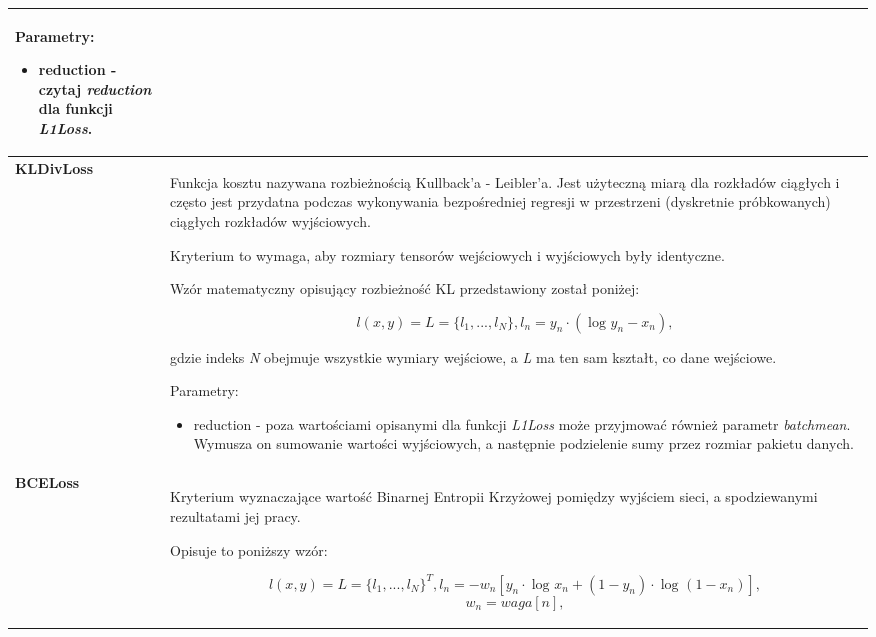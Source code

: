 \begin{enumerate}
\begin{small}
\begin{longtable}{ |m{2cm}|m{12cm}| }
       Parametry:
       \begin{itemize}
       \item reduction - czytaj \textit{reduction} dla funkcji \textit{L1Loss}.
       \end{itemize} \\

     \hline
       \textbf{KLDivLoss} &

       Funkcja kosztu nazywana rozbieżnością Kullback'a - Leibler'a. Jest użyteczną
       miarą dla rozkładów ciągłych i często jest przydatna podczas wykonywania
       bezpośredniej regresji w przestrzeni (dyskretnie próbkowanych) ciągłych
       rozkładów wyjściowych.

       Kryterium to wymaga, aby rozmiary tensorów wejściowych i wyjściowych były
       identyczne.

       Wzór matematyczny opisujący rozbieżność KL przedstawiony został poniżej:

       \begin{equation}
       l(x,y) = L = \{l_1,...,l_N\}, l_n = y_n \cdot (\log_{}y_n - x_n),
     \end{equation}

       gdzie indeks \textit{N} obejmuje wszystkie wymiary wejściowe, a \textit{L}
       ma ten sam kształt, co dane wejściowe.

       Parametry:
       \begin{itemize}
       \item reduction - poza wartościami opisanymi dla funkcji \textit{L1Loss}
       może przyjmować również parametr \textit{batchmean}. Wymusza on sumowanie
       wartości wyjściowych, a następnie podzielenie sumy przez rozmiar pakietu danych.
       \end{itemize} \\

     \hline
       \textbf{BCELoss} &

       Kryterium wyznaczające wartość Binarnej Entropii Krzyżowej pomiędzy wyjściem
       sieci, a spodziewanymi rezultatami jej pracy.

       Opisuje to poniższy wzór:

       \begin{equation}
       l(x,y) = L = \{l_1,...,l_N\}^T, l_n = -w_n[y_n \cdot \log_{}x_n + (1 - y_n) \cdot \log_{}(1 - x_n)],
     \end{equation}
       \begin{equation}
       w_n = waga[n],
     \end{equation}


\end{longtable}
\end{small}
\end{enumerate}
